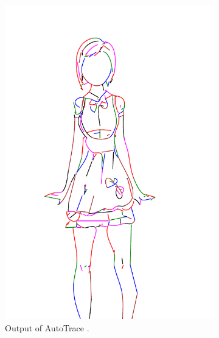 \begin{figure}[h]
\begin{subfigure}{.3\textwidth}
    \includegraphics[width=\textwidth]{graphics/outputs/autotrace/order/sketchbench-black_Art_freeform_AG_03_Branislav Mirkovic_norm_cleaned.pdf}
    \caption{Output of AutoTrace \citep{autotrace}.}
    \end{subfigure}
    \begin{subfigure}{.3\textwidth}

\end{subfigure}
\end{figure}
